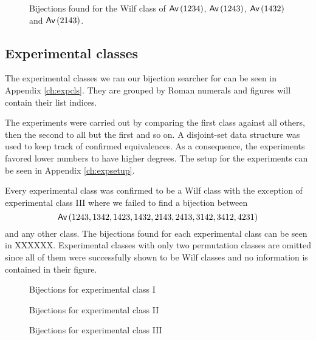 \begin{figure}[ht!]
    \centering
    
    \caption{Bijections found for the Wilf class of $\textsf{Av}\left(1234\right)$, $\textsf{Av}\left(1243\right)$, $\textsf{Av}\left(1432\right)$ and $\textsf{Av}\left(2143\right)$.}
    \label{fig:1x4bi}
\end{figure}

\subsection{Experimental classes}
The experimental classes we ran our bijection searcher for can be seen in Appendix \ref{ch:expcls}. They are grouped by Roman numerals and figures will contain their list indices.

The experiments were carried out by comparing the first class against all others, then the second to all but the first and so on. A disjoint-set data structure was used to keep track of confirmed equivalences. As a consequence, the experiments favored lower numbers to have higher degrees. The setup for the experiments can be seen in Appendix \ref{ch:expsetup}.

Every experimental class was confirmed to be a Wilf class with the exception of experimental class III where we failed to find a bijection between
\[
    \textsf{Av}\left(1243,1342,1423,1432,2143,2413,3142,3412,4231\right)
\]
and any other class. The bijections found for each experimental class can be seen in XXXXXX. Experimental classes with only two permutation classes are omitted since all of them were successfully shown to be Wilf classes and no information is contained in their figure.


\begin{figure}[ht!]
    \centering
    
    \caption{Bijections for experimental class I}
    \label{fig:expgrp_I}
\end{figure}


\begin{figure}[ht!]
    \centering
    
    \caption{Bijections for experimental class II}
    \label{fig:expgrp_II}
\end{figure}


\begin{figure}[ht!]
    \centering
    
    \caption{Bijections for experimental class III}
    \label{fig:expgrp_III}
\end{figure}


